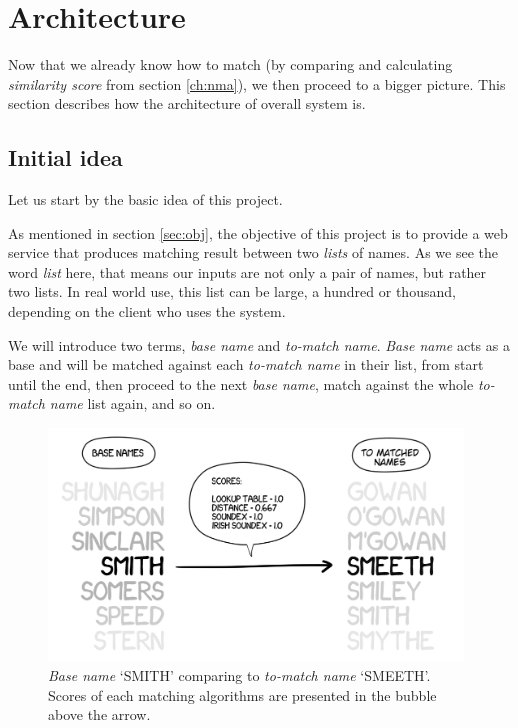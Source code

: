 \chapter{Architecture}
\label{ch:architecture}

Now that we already know how to match (by comparing and calculating
\emph{similarity score} from section \ref{ch:nma}), we then proceed
to a bigger picture. This section describes how the architecture
of overall system is.

\section{Initial idea}
\label{sec:initialidea}

Let us start by the basic idea of this project.

As mentioned in section \ref{sec:obj}, the objective of this project is
to provide a web service that produces matching result between two
\emph{lists} of names. As we see the word \emph{list} here, that means
our inputs are not only a pair of names, but rather two lists.
In real world use, this list can be large, a hundred or thousand,
depending on the client who uses the system.

We will introduce two terms, \emph{base name} and \emph{to-match name}.
\emph{Base name} acts as a base and will be matched against each
\emph{to-match name} in their list, from start until the end, then
proceed to the next \emph{base name}, match against the whole
\emph{to-match name} list again, and so on.

\begin{figure}[H]
\centering
\captionsetup{justification=centering}
\includegraphics[width=11cm]{gfx/base_tmn}
\caption[\emph{Base name} `SMITH' comparing to \emph{to-match name} `SMEETH'.]{\emph{Base name}
`SMITH' comparing to \emph{to-match name} `SMEETH'. \\
Scores of each matching algorithms
are presented in the bubble above the arrow.}
\label{fig:base_tmn}
\end{figure}

